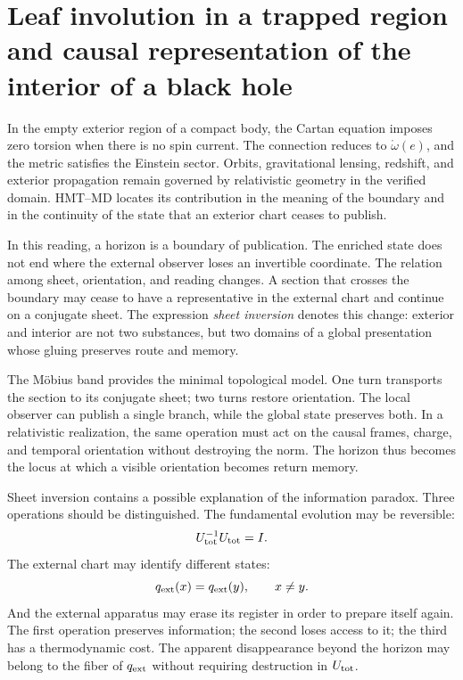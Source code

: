 \section{Leaf involution in a trapped region and causal representation of the interior of a black hole}

In the empty exterior region of a compact body, the Cartan equation imposes
zero torsion when there is no spin current. The connection reduces to
\(\mathring\omega(e)\), and the metric satisfies the Einstein sector. Orbits,
gravitational lensing, redshift, and exterior propagation remain
governed by relativistic geometry in the verified domain. HMT--MD locates its
contribution in the meaning of the boundary and in the continuity of the state that an
exterior chart ceases to publish.

In this reading, a horizon is a boundary of publication. The enriched
state does not end where the external observer loses an invertible
coordinate. The relation among sheet, orientation, and reading changes. A section that
crosses the boundary may cease to have a representative in the external chart and
continue on a conjugate sheet. The expression \emph{sheet inversion} denotes this
change: exterior and interior are not two substances, but two domains of a
global presentation whose gluing preserves route and memory.

The Möbius band provides the minimal topological model. One turn transports the section to its conjugate sheet; two turns restore orientation. The local observer can publish a single branch, while the global state preserves both. In a relativistic realization, the same operation must act on the causal frames, charge, and temporal orientation without destroying the norm. The horizon thus becomes the locus at which a visible orientation becomes return memory.

Sheet inversion contains a possible explanation of the information
paradox. Three operations should be distinguished. The fundamental evolution may
be reversible:
\[
 U_{\rm tot}^{-1}U_{\rm tot}=I.
\]
The external chart may identify different states:
\[
 q_{\rm ext}(x)=q_{\rm ext}(y),
 \qquad x\neq y.
\]
And the external apparatus may erase its register in order to prepare itself again. The first
operation preserves information; the second loses access to it; the third has
a thermodynamic cost. The apparent disappearance beyond the horizon may belong
to the fiber of \(q_{\rm ext}\) without requiring destruction in \(U_{\rm tot}\).

